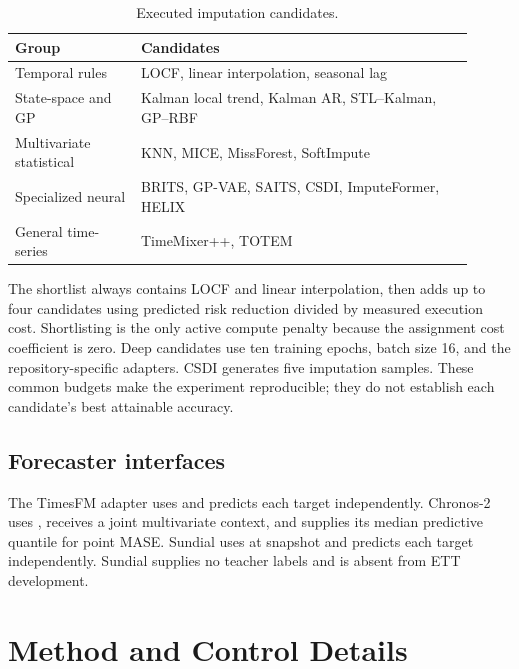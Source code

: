 \begin{table}[h]
\caption{Executed imputation candidates.}
\label{tab:candidate-pool-r2}
\centering
\small
\begin{tabular}{p{0.25\linewidth}p{0.66\linewidth}}
\toprule
Group & Candidates \\
\midrule
Temporal rules & LOCF, linear interpolation, seasonal lag \\
State-space and GP & Kalman local trend, Kalman AR, STL--Kalman, GP--RBF \\
Multivariate statistical & KNN, MICE, MissForest, SoftImpute \\
Specialized neural & BRITS, GP-VAE, SAITS, CSDI, ImputeFormer, HELIX \\
General time-series & TimeMixer++, TOTEM \\
\bottomrule
\end{tabular}
\end{table}

The shortlist always contains LOCF and linear interpolation, then adds up to four candidates using predicted risk reduction divided by measured execution cost. Shortlisting is the only active compute penalty because the assignment cost coefficient is zero. Deep candidates use ten training epochs, batch size 16, and the repository-specific adapters. CSDI generates five imputation samples. These common budgets make the experiment reproducible; they do not establish each candidate's best attainable accuracy.

\subsection{Forecaster interfaces}

The TimesFM adapter uses  \citep{google2025timesfm25} and predicts each target independently. Chronos-2 uses  \citep{ansari2025chronos2}, receives a joint multivariate context, and supplies its median predictive quantile for point MASE. Sundial uses  at snapshot  and predicts each target independently. Sundial supplies no teacher labels and is absent from ETT development.

\section{Method and Control Details}
\label{app:method-details}

